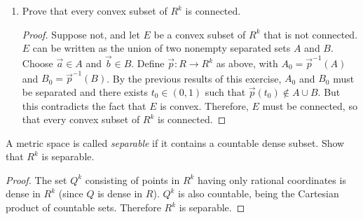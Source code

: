 \begin{enumerate}
\begin{proof}
    are separated. So by Theorem~2.47 there exists $t_0\in(0,1)$ such
    that $t_0\not\in A_0\cup B_0$. Then by definition
    $\vec{p}(t_0)\not\in A\cup B$.
  \end{proof}
\item Prove that every convex subset of $R^k$ is connected.
  \begin{proof}
    Suppose not, and let $E$ be a convex subset of $R^k$ that is not
    connected. $E$ can be written as the union of two nonempty
    separated sets $A$ and $B$. Choose $\vec{a}\in A$ and
    $\vec{b}\in B$. Define $\vec{p}\colon R\to R^k$ as above, with
    $A_0 = \vec{p}^{-1}(A)$ and $B_0 = \vec{p}^{-1}(B)$. By the
    previous results of this exercise, $A_0$ and $B_0$ must be
    separated and there exists $t_0\in(0,1)$ such that
    $\vec{p}(t_0)\not\in A\cup B$. But this contradicts the fact that
    $E$ is convex. Therefore, $E$ must be connected, so that every
    convex subset of $R^k$ is connected.
\end{proof}
\end{enumerate}

 A metric space is called {\em separable} if it contains
a countable dense subset. Show that $R^k$ is separable.
\begin{proof}
  The set $Q^k$ consisting of points in $R^k$ having only rational
  coordinates is dense in $R^k$ (since $Q$ is dense in $R$). $Q^k$ is
  also countable, being the Cartesian product of countable
  sets. Therefore $R^k$ is separable.
\end{proof}
